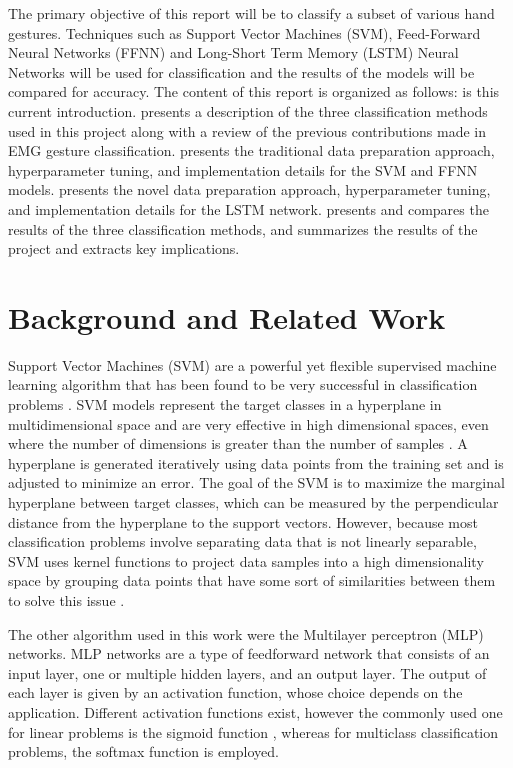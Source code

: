 \documentclass[journal]{IEEEtran}
\begin{document}
The primary objective of this report will be to classify a subset of various hand gestures. Techniques such as Support Vector Machines (SVM), Feed-Forward Neural Networks (FFNN) and Long-Short Term Memory (LSTM) Neural Networks will be used for classification and the results of the models will be compared for accuracy. The content of this report is organized as follows:  is this current introduction.  presents a description of the three classification methods used in this project along with a review of the previous contributions made in EMG gesture classification.  presents the traditional data preparation approach, hyperparameter tuning, and implementation details for the SVM and FFNN models.  presents the novel data preparation approach, hyperparameter tuning, and implementation details for the LSTM network.  presents and compares the results of the three classification methods, and  summarizes the results of the project and extracts key implications.

\label{sec:back}
\label{sec:mat_met}

\section{Background and Related Work}
\label{sec:back}
Support Vector Machines (SVM) are a powerful yet flexible supervised machine learning algorithm that has been found to be very successful in classification problems \cite{hearst1998}. SVM models represent the target classes in a hyperplane in multidimensional space and are very effective in high dimensional spaces, even where the number of dimensions is greater than the number of samples \cite{scikit-learn}. A hyperplane is generated iteratively using data points from the training set and is adjusted to minimize an error. The goal of the SVM is to maximize the marginal hyperplane between target classes, which can be measured by the perpendicular distance from the hyperplane to the support vectors. However, because most classification problems involve separating data that is not linearly separable, SVM uses kernel functions to project data samples into a high dimensionality space by grouping data points that have some sort of similarities between them to solve this issue \cite{hearst1998}. 

The other algorithm used in this work were the Multilayer perceptron (MLP) networks. MLP networks are a type of feedforward network that consists of an input layer, one or multiple hidden layers, and an output layer. The output of each layer is given by an activation function, whose choice depends on the application. Different activation functions exist, however the commonly used one for linear problems is the sigmoid function \cite{bishop2006}, whereas for multiclass classification problems, the softmax function is employed.
\end{document}
